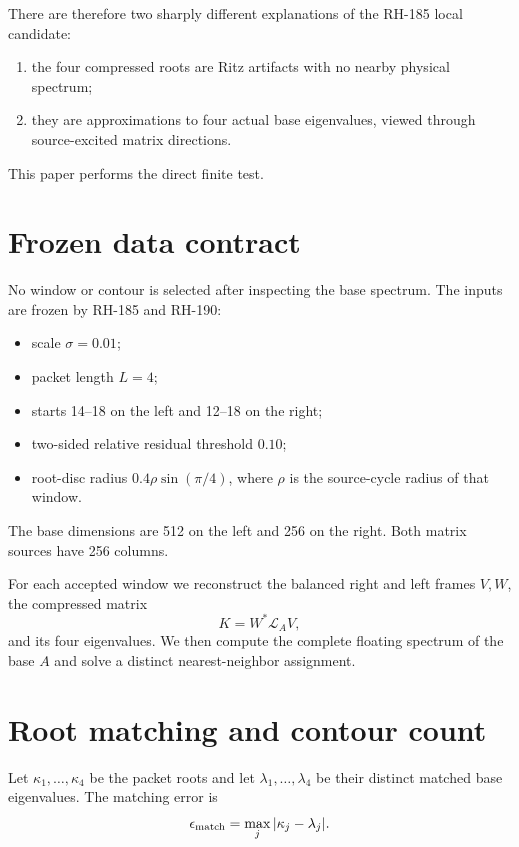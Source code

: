 \documentclass[12pt]{article}
\theoremstyle{remark}
\begin{document}
There are therefore two sharply different explanations of the RH-185 local
candidate:
\begin{enumerate}[leftmargin=2em]
\item the four compressed roots are Ritz artifacts with no nearby physical
 spectrum;
\item they are approximations to four actual base eigenvalues, viewed
 through source-excited matrix directions.
\end{enumerate}
This paper performs the direct finite test.

\section{Frozen data contract}

No window or contour is selected after inspecting the base spectrum.  The
inputs are frozen by RH-185 and RH-190:
\begin{itemize}[leftmargin=2em]
\item scale $\sigma=0.01$;
\item packet length $L=4$;
\item starts 14--18 on the left and 12--18 on the right;
\item two-sided relative residual threshold $0.10$;
\item root-disc radius $0.4\rho\sin(\pi/4)$, where $\rho$ is the source-cycle
 radius of that window.
\end{itemize}
The base dimensions are 512 on the left and 256 on the right.  Both matrix
sources have 256 columns.

For each accepted window we reconstruct the balanced right and left frames
$V,W$, the compressed matrix
\begin{equation}\label{eq:K}
 K=W^*\mathcal L_AV,
\end{equation}
and its four eigenvalues.  We then compute the complete floating spectrum of
the base $A$ and solve a distinct nearest-neighbor assignment.

\section{Root matching and contour count}

Let $\kappa_1,\ldots,\kappa_4$ be the packet roots and let
$\lambda_1,\ldots,\lambda_4$ be their distinct matched base eigenvalues.
The matching error is
\begin{equation}\label{eq:matching-error}
 \epsilon_{\rm match}=\max_j|\kappa_j-\lambda_j|.
\end{equation}
\end{document}
